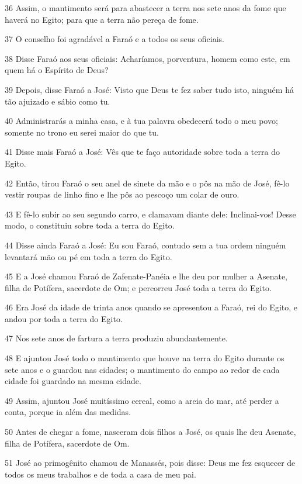 \par 36 Assim, o mantimento será para abastecer a terra nos sete anos da fome que haverá no Egito; para que a terra não pereça de fome.
\par 37 O conselho foi agradável a Faraó e a todos os seus oficiais.
\par 38 Disse Faraó aos seus oficiais: Acharíamos, porventura, homem como este, em quem há o Espírito de Deus?
\par 39 Depois, disse Faraó a José: Visto que Deus te fez saber tudo isto, ninguém há tão ajuizado e sábio como tu.
\par 40 Administrarás a minha casa, e à tua palavra obedecerá todo o meu povo; somente no trono eu serei maior do que tu.
\par 41 Disse mais Faraó a José: Vês que te faço autoridade sobre toda a terra do Egito.
\par 42 Então, tirou Faraó o seu anel de sinete da mão e o pôs na mão de José, fê-lo vestir roupas de linho fino e lhe pôs ao pescoço um colar de ouro.
\par 43 E fê-lo subir ao seu segundo carro, e clamavam diante dele: Inclinai-vos! Desse modo, o constituiu sobre toda a terra do Egito.
\par 44 Disse ainda Faraó a José: Eu sou Faraó, contudo sem a tua ordem ninguém levantará mão ou pé em toda a terra do Egito.
\par 45 E a José chamou Faraó de Zafenate-Panéia e lhe deu por mulher a Asenate, filha de Potífera, sacerdote de Om; e percorreu José toda a terra do Egito.
\par 46 Era José da idade de trinta anos quando se apresentou a Faraó, rei do Egito, e andou por toda a terra do Egito.
\par 47 Nos sete anos de fartura a terra produziu abundantemente.
\par 48 E ajuntou José todo o mantimento que houve na terra do Egito durante os sete anos e o guardou nas cidades; o mantimento do campo ao redor de cada cidade foi guardado na mesma cidade.
\par 49 Assim, ajuntou José muitíssimo cereal, como a areia do mar, até perder a conta, porque ia além das medidas.
\par 50 Antes de chegar a fome, nasceram dois filhos a José, os quais lhe deu Asenate, filha de Potífera, sacerdote de Om.
\par 51 José ao primogênito chamou de Manassés, pois disse: Deus me fez esquecer de todos os meus trabalhos e de toda a casa de meu pai.
